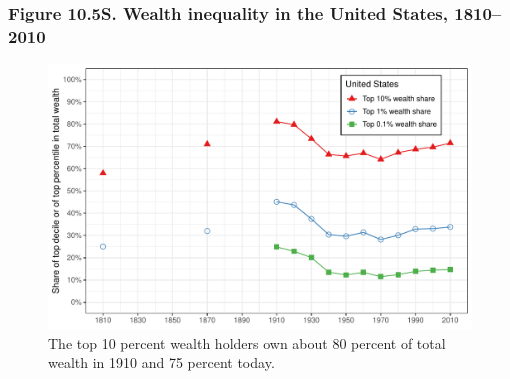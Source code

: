 \documentclass[t]{beamer}\usepackage[]{graphicx}\usepackage[]{color}
\newenvironment{knitrout}{}{} %
\begin{document}
\begin{frame}[label=Figure_10_5S]
\frametitle{Figure 10.5S. Wealth inequality in the United States, 1810--2010}
\begin{figure}[t]
\begin{minipage}[b]{\textwidth}
\centering
\begin{knitrout}\footnotesize
{}\color{fgcolor}

{\centering \includegraphics[width=1\linewidth]{figures/color/Figure_10_5S} 

}



\end{knitrout}
\caption{The top 10 percent wealth holders own about 80 percent of total wealth in 1910 and 75 percent today.}
\end{minipage}
\end{figure}
\end{frame}
\end{document}
